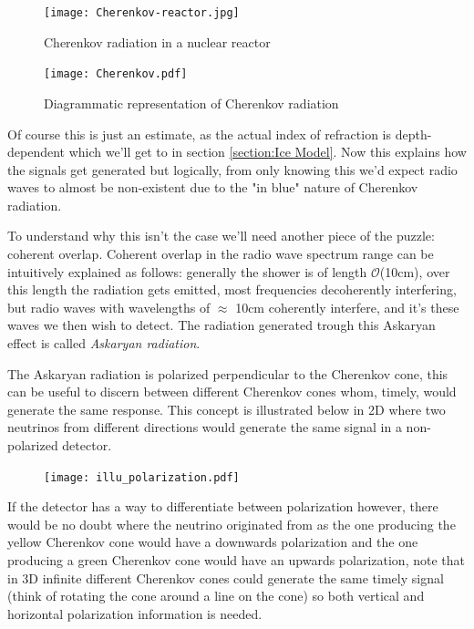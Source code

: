 \begin{figure}
\centering
\begin{minipage}{0.45\textwidth}
	\centering
	\texttt{[image: Cherenkov-reactor.jpg]}
	\caption{Cherenkov radiation in a nuclear reactor }
	\label{The particles coming from the reactor core produce cherenkov radiation as they pass through the water,
	most of the produced light is "in blue".}
\end{minipage}
\hspace{0.05\textwidth}
\begin{minipage}{0.45\textwidth}
	\centering
	\texttt{[image: Cherenkov.pdf]}
	\caption{Diagrammatic representation of Cherenkov radiation }
	\label{figure: Cherenkov illustratie}
\end{minipage}
\end{figure}
Of course this is just an estimate, as the actual index of refraction is depth-dependent which
we'll get to in section \ref{section:Ice Model}.
Now this explains how the signals get generated but logically, from only knowing this
we'd expect radio waves to almost be non-existent 
due to the "in blue" nature of Cherenkov radiation. 

To understand why this isn't the case we'll need another piece of the puzzle: coherent overlap.
Coherent overlap in the radio wave spectrum range can be intuitively explained as
follows: generally the shower is of length
$\mathcal{O}$(10cm)\cite{Huege_2017}, over this length the radiation gets
emitted, most frequencies decoherently interfering, but radio waves with wavelengths of 
$\approx$ 10cm coherently interfere, and it's these waves we then wish to detect.
The radiation generated trough this Askaryan effect is called \textit{Askaryan radiation}.

The Askaryan radiation is polarized perpendicular to the
Cherenkov cone, this can be useful to discern between different Cherenkov cones whom,
timely, would generate the same response. This concept is illustrated below in 2D where
two neutrinos from different directions would generate the same signal in a non-polarized detector.

\begin{figure}[h!]
	\centering
	\texttt{[image: illu\_polarization.pdf]}
\end{figure}

If the detector has a way to differentiate between polarization however, there would be no
doubt where the neutrino originated from as the one producing the yellow Cherenkov cone
would have a downwards polarization and the one producing a green Cherenkov cone would have
an upwards polarization, note that in 3D infinite different Cherenkov cones could generate
the same timely signal (think of rotating the cone around a line on the cone) so both vertical
and horizontal polarization information is needed.


